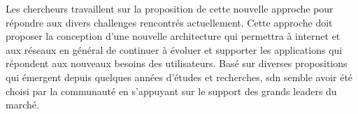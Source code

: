 

Les chercheurs travaillent sur la proposition de cette nouvelle approche pour répondre aux divers challenges rencontrés actuellement. 
Cette approche doit proposer la conception d'une nouvelle architecture qui permettra à internet et aux réseaux en général de continuer à évoluer et supporter les applications qui répondent aux nouveaux besoins des utilisateurs. 
Basé sur diverses propositions qui émergent depuis quelques années d'études et recherches, \gls{sdn} semble avoir été choisi par la communauté en s'appuyant sur le support des grands leaders du marché.  \cite{SurveySDNIntro}


